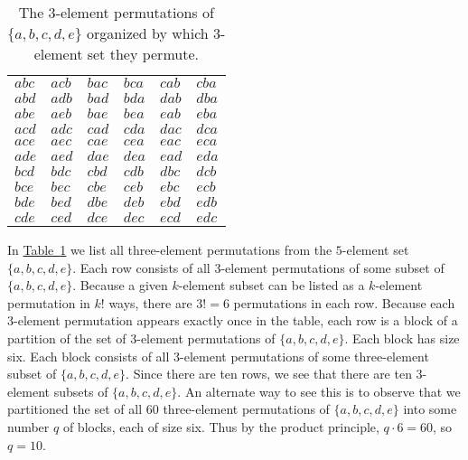 \documentclass[10pt,]{book}
\theoremstyle{plain}
\theoremstyle{definition}
\theoremstyle{definition}
\numberwithin{equation}{chapter}
\begin{document}
\begin{table}
\centering
\begin{tabular}{llllll}
\(abc\)&\(acb\)&\(bac\)&\(bca\)&\(cab\)&\(cba\)\tabularnewline[0pt]
\(abd\)&\(adb\)&\(bad\)&\(bda\)&\(dab\)&\(dba\)\tabularnewline[0pt]
\(abe\)&\(aeb\)&\(bae\)&\(bea\)&\(eab\)&\(eba\)\tabularnewline[0pt]
\(acd\)&\(adc\)&\(cad\)&\(cda\)&\(dac\)&\(dca\)\tabularnewline[0pt]
\(ace\)&\(aec\)&\(cae\)&\(cea\)&\(eac\)&\(eca\)\tabularnewline[0pt]
\(ade\)&\(aed\)&\(dae\)&\(dea\)&\(ead\)&\(eda\)\tabularnewline[0pt]
\(bcd\)&\(bdc\)&\(cbd\)&\(cdb\)&\(dbc\)&\(dcb\)\tabularnewline[0pt]
\(bce\)&\(bec\)&\(cbe\)&\(ceb\)&\(ebc\)&\(ecb\)\tabularnewline[0pt]
\(bde\)&\(bed\)&\(dbe\)&\(deb\)&\(ebd\)&\(edb\)\tabularnewline[0pt]
\(cde\)&\(ced\)&\(dce\)&\(dec\)&\(ecd\)&\(edc\)
\end{tabular}
\caption{The \(3\)-element permutations of \(\{a,b,c,d,e\}\) organized by which \(3\)-element set they permute.\label{tab_permsof3}}
\end{table}
\hypertarget{p-221}{}%
In \hyperref[tab_permsof3]{Table~\ref{tab_permsof3}} we list all three-element permutations from the \(5\)-element set \(\{a,b,c,d,e\}\). Each row consists of all \(3\)-element permutations of some subset of \(\{a,b,c,d,e\}\). Because a given \(k\)-element subset can be listed as a \(k\)-element permutation in \(k!\) ways, there are \(3!=6\) permutations in each row. Because each \(3\)-element permutation appears exactly once in the table, each row is a block of a partition of the set of \(3\)-element permutations of \(\{a,b,c,d,e\}\). Each block has size six. Each block consists of all \(3\)-element permutations of some three-element subset of \(\{a,b,c,d,e\}\). Since there are ten rows, we see that there are ten \(3\)-element subsets of \(\{a,b,c,d,e\}\). An alternate way to see this is to observe that we partitioned the set of all \(60\) three-element permutations of \(\{a,b,c,d,e\}\) into some number \(q\) of blocks, each of size six. Thus by the product principle, \(q\cdot 6=60\), so \(q=10\).%
\end{document}

